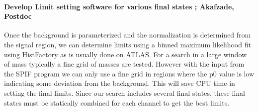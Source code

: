 
\paragraph{Develop Limit setting software for various final states ;  Akafzade, Postdoc} %
Once the background is parameterized and the normalization is determined from the signal region, we can determine limits using a binned maximum likelihood fit using  HistFactory as is usually done on ATLAS. 
For a search in a large window of mass typically a fine grid of masses are tested.  However with the input from the SPIF program we can only use a fine grid in regions where the p0 value is low indicating some deviation
from the background.  This will save CPU time in setting the final limits. 
Since our search includes several final states, these final states must be statically combined for each channel to get the best limits. 


